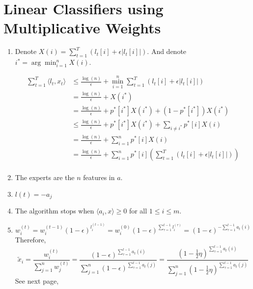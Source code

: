 \documentclass[11pt]{article}
\newenvironment{qparts}{\begin{enumerate}[{(}a{)}]}{\end{enumerate}}
\begin{document}
\section{Linear Classifiers using Multiplicative Weights}
\begin{qparts}
	
	\item 

	Denote $X(i) = \sum_{t=1}^T(l_t[i] + \epsilon | l_t[i] | )$. And denote $i^* = \arg\min_{i=1}^n X(i)$.
	
	
	\begin{align*}
		\sum_{t=1}^T \langle l_t,x_t \rangle
		&\le
		\frac{\log(n)}{\epsilon} + \min_{i=1}^n \sum_{t=1}^T(l_t[i] + \epsilon | l_t[i] | ) \\
		&=
		\frac{\log(n)}{\epsilon} + X(i^*) \\
		&=
		\frac{\log(n)}{\epsilon} + p^*[i^*]X(i^*) + (1 - p^*[i^*])X(i^*) \\
		&\le
		\frac{\log(n)}{\epsilon} + p^*[i^*]X(i^*) + \sum_{i\ne i^*} p^*[i]X(i) \\
		&=
		\frac{\log(n)}{\epsilon} + \sum_{i=1}^n p^*[i]X(i) \\
		&=
		\frac{\log(n)}{\epsilon} + \sum_{i=1}^n p^*[i]( \sum_{t=1}^T(l_t[i] + \epsilon | l_t[i] | )) \\
	\end{align*}
	
	\item
	
	The experts are the $n$ features in $a$.
	
	\item
	
	$l(t)=-a_j$
	
	\item
	
	The algorithm stops when $\langle a_i,x \rangle \ge 0$ for all $1 \le i \le m$.
	
	\item

	\[
		w_i^{(t)} 
		= w_i^{(t-1)}(1 - \epsilon)^{l_i^{(t-1)}} 
		= w_i^{(0)}(1 - \epsilon)^{\sum_{\tau=1}^{t-1} l_i^{(\tau)}}
		= (1 - \epsilon)^{-\sum_{\tau=1}^{t-1}a_t(i)}
	\]
	Therefore,
	\[
		\widetilde x_i
		= \frac{w_i^{(t)}}{\sum_{j=1}^{n} w_j^{(t)} }
		= \frac{(1 - \epsilon)^{\sum_{\tau=1}^{t-1}a_t(i)}}{\sum_{j=1}^n(1 - \epsilon)^{\sum_{\tau=1}^{t-1}a_t(j)}}
		= \frac{(1 - \frac{1}{2}\eta)^{\sum_{\tau=1}^{t-1}a_t(i)}}{\sum_{j=1}^n(1 - \frac{1}{2}\eta)^{\sum_{\tau=1}^{t-1}a_t(j)}}
	\]
	See next page,
	

\end{qparts}
\end{document}
